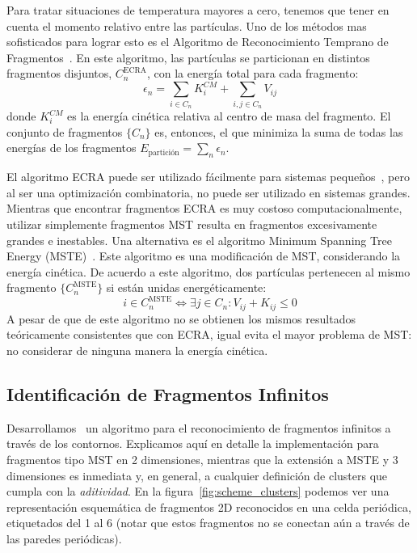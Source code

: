 Para tratar situaciones de temperatura mayores a cero, tenemos que tener en cuenta el momento relativo entre las partículas.
Uno de los métodos mas sofisticados para lograr esto es el Algoritmo de Reconocimiento Temprano de Fragmentos~\cite{dorso_early_1993}.
En este algoritmo, las partículas se particionan en distintos fragmentos disjuntos, $C^{\text{ECRA}}_n$, con la energía total para cada fragmento:
\begin{equation*}
  \epsilon_n = \sum_{i \in C_n} K^{CM}_i +  \sum_{i,j \in C_n} V_{ij}
\end{equation*}
donde $K^{CM}_i$ es la energía cinética relativa al centro de masa del fragmento.
El conjunto de fragmentos $\{C_n\}$ es, entonces, el que minimiza la suma de todas las energías de los fragmentos $E_{\text{partición}} = \sum_n \epsilon_n$.

El algoritmo ECRA puede ser utilizado fácilmente para sistemas pequeños~\cite{dorso_fluctuation_1994}, pero al ser una optimización combinatoria, no puede ser utilizado en sistemas grandes.
Mientras que encontrar fragmentos ECRA es muy costoso computacionalmente, utilizar simplemente fragmentos MST resulta en fragmentos excesivamente grandes e inestables.
Una alternativa es el algoritmo Minimum Spanning Tree Energy (MSTE)~\cite{dorso_topological_2012}.
Este algoritmo es una modificación de MST, considerando la energía cinética.
De acuerdo a este algoritmo, dos partículas pertenecen al mismo fragmento $\{C^{\text{MSTE}}_n\}$ si están unidas energéticamente:
\begin{equation*}
  i \in C^{\text{MSTE}}_n \Leftrightarrow \exists j \in C_n :  V_{ij}+ K_{ij} \le 0
\end{equation*}
A pesar de que de este algoritmo no se obtienen los mismos resultados teóricamente consistentes que con ECRA, igual evita el mayor problema de MST: no considerar de ninguna manera la energía cinética.

\subsection{Identificación de Fragmentos Infinitos}
Desarrollamos~\cite{alcain_fragmentation_2017} un algoritmo para el reconocimiento de fragmentos infinitos a través de los contornos.
Explicamos aquí en detalle la implementación para fragmentos tipo MST en 2 dimensiones, mientras que la extensión a MSTE y 3 dimensiones es inmediata y, en general, a cualquier definición de clusters que cumpla con la \emph{aditividad}.
En la figura~\ref{fig:scheme_clusters} podemos ver una representación esquemática de fragmentos 2D reconocidos en una celda periódica, etiquetados del 1 al 6 (notar que estos fragmentos no se conectan aún a través de las paredes periódicas).

